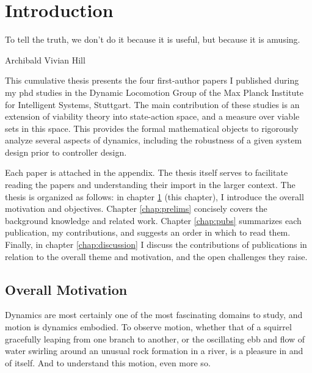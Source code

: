 
\chapter{Introduction} \label{chap:intro}
\epigraph{To tell the truth, we don't do it because it is useful, but because it is amusing.}{Archibald Vivian Hill}

This cumulative thesis presents the four first-author papers I published during my phd studies in the Dynamic Locomotion Group of the Max Planck Institute for Intelligent Systems, Stuttgart. The main contribution of these studies is an extension of viability theory into state-action space, and a measure over viable sets in this space. This provides the formal mathematical objects to rigorously analyze several aspects of dynamics, including the robustness of a given system design prior to controller design. \par
Each paper is attached in the appendix. The thesis itself serves to facilitate reading the papers and understanding their import in the larger context. The thesis is organized as follows: in chapter \ref{chap:intro} (this chapter), I introduce the overall motivation and objectives.
Chapter \ref{chap:prelims} concisely covers the background knowledge and related work.
Chapter \ref{chap:pubs} summarizes each publication, my contributions, and suggests an order in which to read them.
Finally, in chapter \ref{chap:discussion} I discuss the contributions of publications in relation to the overall theme and motivation, and the open challenges they raise.

\section{Overall Motivation}

Dynamics are most certainly one of the most fascinating domains to study, and motion is dynamics embodied. To observe motion, whether that of a squirrel gracefully leaping from one branch to another, or the oscillating ebb and flow of water swirling around an unusual rock formation in a river, is a pleasure in and of itself. And to understand this motion, even more so. \par

